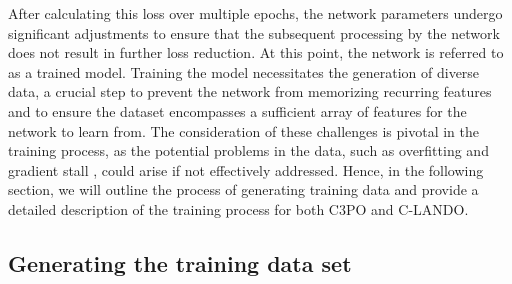 \documentclass{aa}
\begin{document}
After calculating this loss over multiple epochs, the network parameters undergo significant adjustments to ensure that the subsequent processing by the network does not result in further loss reduction. At this point, the network is referred to as a trained model.
Training the model necessitates the generation of diverse data, a crucial step to prevent the network from memorizing recurring features and to ensure the dataset encompasses a sufficient array of features for the network to learn from. The consideration of these challenges is pivotal in the training process, as the potential problems in the data, such as overfitting \citep[][]{dietterich1995overfitting} and gradient stall \citep[][]{patel2017sgd}, could arise if not effectively addressed.
Hence, in the following section, we will outline the process of generating training data and provide a detailed description of the training process for both C3PO and C-LANDO.

\subsection{Generating the training data set}
\end{document}

